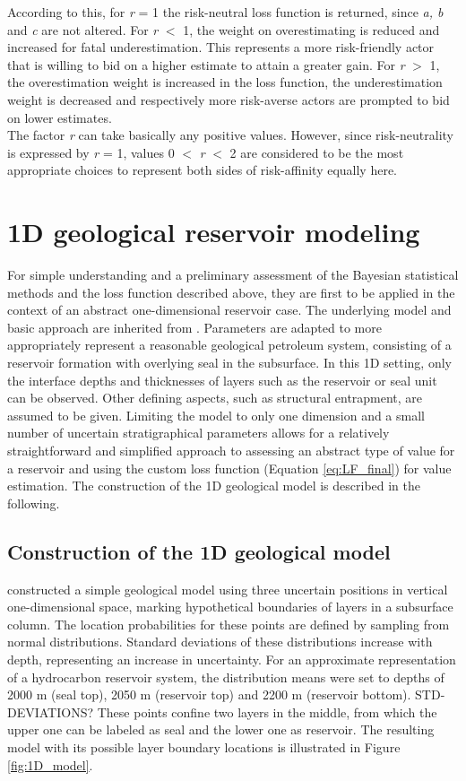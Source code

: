 		According to this, for \textit{r} = 1 the risk-neutral loss function is returned, since \textit{a, b} and \textit{c} are not altered. For \textit{r} $<$ 1, the weight on overestimating is reduced and increased for fatal underestimation. This represents a more risk-friendly actor that is willing to bid on a higher estimate to attain a greater gain. For \textit{r} $>$ 1, the overestimation weight is increased in the loss function, the underestimation weight is decreased and respectively more risk-averse actors are prompted to bid on lower estimates.\\		
		The factor \textit{r} can take basically any positive values. However, since risk-neutrality is expressed by \textit{r} = 1, values 0 $<$ \textit{r} $<$ 2 are considered to be the most appropriate choices to represent both sides of risk-affinity equally here.		
		
		\section{1D geological reservoir modeling}\label{sec:1D_model}
		For simple understanding and a preliminary assessment of the Bayesian statistical methods and the loss function described above, they are first to be applied in the context of an abstract one-dimensional reservoir case. The underlying model and basic approach are inherited from \citet{delaVarga2016}. Parameters are adapted to more appropriately represent a reasonable geological petroleum system, consisting of a reservoir formation with overlying seal in the subsurface. In this 1D setting, only the interface depths and thicknesses of layers such as the reservoir or seal unit can be observed. Other defining aspects, such as structural entrapment, are assumed to be given. Limiting the model to only one dimension and a small number of uncertain stratigraphical parameters allows for a relatively straightforward and simplified approach to assessing an abstract type of value for a reservoir and using the custom loss function (Equation \ref{eq:LF_final}) for value estimation. The construction of the 1D geological model is described in the following.
		
			\subsection{Construction of the 1D geological model}\label{sec:1D_construction}	
			\citet{delaVarga2016} constructed a simple geological model using three uncertain positions in vertical one-dimensional space, marking hypothetical boundaries of layers in a subsurface column. The location probabilities for these points are defined by sampling from normal distributions. Standard deviations of these distributions increase with depth, representing an increase in uncertainty. For an approximate representation of a hydrocarbon reservoir system, the distribution means were set to depths of 2000 m (seal top), 2050 m (reservoir top) and 2200 m (reservoir bottom). STD-DEVIATIONS? These points confine two layers in the middle, from which the upper one can be labeled as seal and the lower one as reservoir. The resulting model with its possible layer boundary locations is illustrated in Figure \ref{fig:1D_model}.
		
